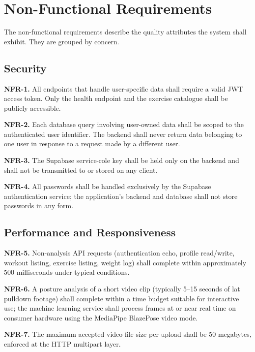 \section{Non-Functional Requirements}
\label{sec:nonfunctional}

The non-functional requirements describe the quality attributes the system shall exhibit. They are grouped by concern.

\subsection{Security}
\label{subsec:nfr-security}

\textbf{NFR-1.} All endpoints that handle user-specific data shall require a valid JWT access token. Only the health endpoint and the exercise catalogue shall be publicly accessible.

\textbf{NFR-2.} Each database query involving user-owned data shall be scoped to the authenticated user identifier. The backend shall never return data belonging to one user in response to a request made by a different user.

\textbf{NFR-3.} The Supabase service-role key shall be held only on the backend and shall not be transmitted to or stored on any client.

\textbf{NFR-4.} All passwords shall be handled exclusively by the Supabase authentication service; the application's backend and database shall not store passwords in any form.

\subsection{Performance and Responsiveness}
\label{subsec:nfr-performance}

\textbf{NFR-5.} Non-analysis API requests (authentication echo, profile read/write, workout listing, exercise listing, weight log) shall complete within approximately 500 milliseconds under typical conditions.

\textbf{NFR-6.} A posture analysis of a short video clip (typically 5–15 seconds of lat pulldown footage) shall complete within a time budget suitable for interactive use; the machine learning service shall process frames at or near real time on consumer hardware using the MediaPipe BlazePose video mode.

\textbf{NFR-7.} The maximum accepted video file size per upload shall be 50 megabytes, enforced at the HTTP multipart layer.

